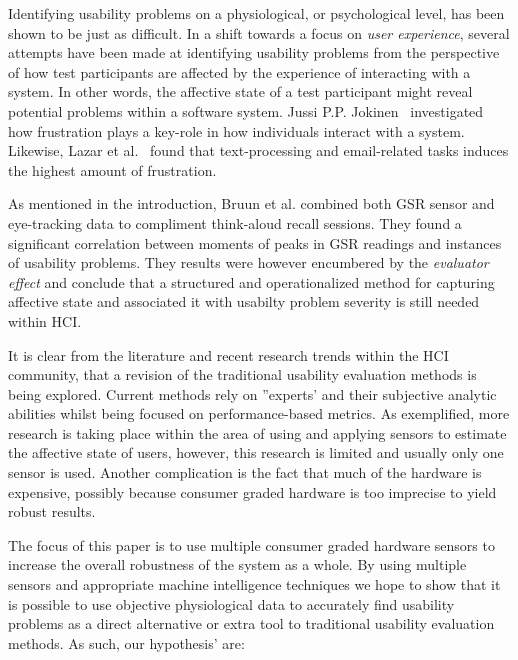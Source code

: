 Identifying usability problems on a physiological, or psychological level, has been shown to be just as difficult. In a
shift towards a focus on \textit{user experience}, several attempts have been made at identifying usability problems
from the perspective of how test participants are affected by the experience of interacting with a system. In other
words, the affective state of a test participant might reveal potential problems within a software system. Jussi
P.P. Jokinen~\cite{workplace_up_study} investigated how frustration plays a key-role in how individuals interact with a
system. Likewise, Lazar et al.~\cite{frustration_with_computers} found that text-processing and email-related tasks
induces the highest amount of frustration.

As mentioned in the introduction, Bruun et al. combined both GSR sensor and
eye-tracking data to compliment think-aloud recall sessions. They found a
significant correlation between moments of peaks in GSR readings and instances
of usability problems. They results were however encumbered by the
\textit{evaluator effect} and conclude that a structured and operationalized
method for capturing affective state and associated it with usabilty problem
severity is still needed within HCI.

It is clear from the literature and recent research trends within the HCI community, that a revision of the traditional usability evaluation methods is being explored. 
Current methods rely on ''experts' and their subjective analytic abilities whilst being focused on performance-based metrics.
As exemplified, more research is taking place within the area of using and applying sensors to estimate the affective state of users, however, this research is limited and usually only one sensor is used. 
Another complication is the fact that much of the hardware is expensive, possibly because consumer graded hardware is too imprecise to yield robust results.

The focus of this paper is to use multiple consumer graded hardware sensors to increase the overall robustness of the system as a whole. 
By using multiple sensors and appropriate machine intelligence techniques we hope to show that it is possible to use objective physiological data to accurately find usability problems as a direct alternative or extra tool to traditional usability evaluation methods. 
As such, our hypothesis' are:\\\\

